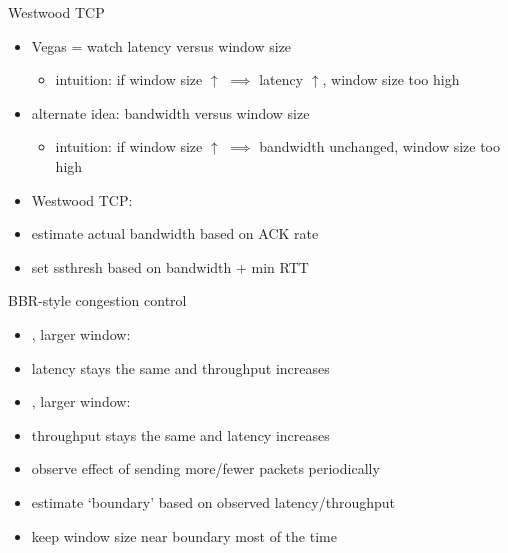\begin{frame}{Westwood TCP}
    \begin{itemize}
    \item Vegas = watch latency versus window size
        \begin{itemize}
        \item intuition: if window size $\uparrow$ $\implies$ latency $\uparrow$, window size too high
        \end{itemize}
    \item alternate idea: bandwidth versus window size
        \begin{itemize}
        \item intuition: if window size $\uparrow$ $\implies$ bandwidth unchanged, window size too high
        \end{itemize}
    \vspace{.5cm}
    \item Westwood TCP:
    \item estimate actual bandwidth based on ACK rate
    \item set ssthresh based on bandwidth + min RTT
    \end{itemize}
\end{frame}

\begin{frame}{BBR-style congestion control}
    \begin{itemize}
    \item {}, larger window:
    \item latency stays the same and throughput increases
    \vspace{.5cm}
    \item {}, larger window:
    \item throughput stays the same and latency increases
    \vspace{.5cm}
    \item<4-> observe effect of sending more/fewer packets periodically
    \item<4-> estimate `boundary' based on observed latency/throughput
    \item<4-> keep window size near boundary most of the time
    \end{itemize}
\end{frame}


